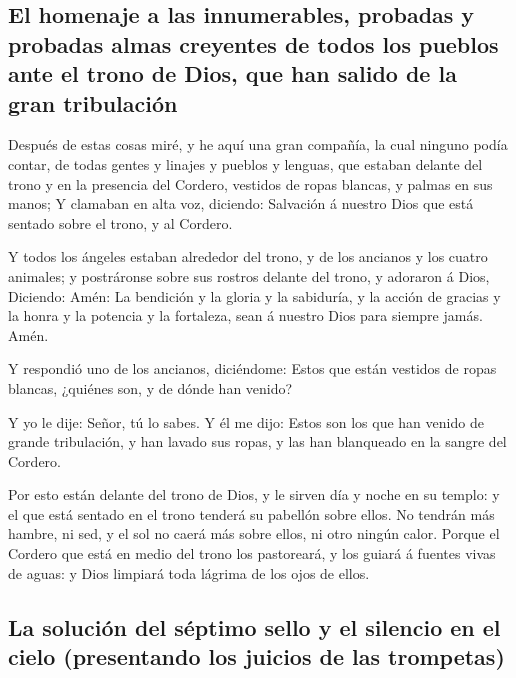 \hypertarget{el-homenaje-a-las-innumerables-probadas-y-probadas-almas-creyentes-de-todos-los-pueblos-ante-el-trono-de-dios-que-han-salido-de-la-gran-tribulaciuxf3n}{%
\subsection{El homenaje a las innumerables, probadas y probadas almas
creyentes de todos los pueblos ante el trono de Dios, que han salido de
la gran
tribulación}\label{el-homenaje-a-las-innumerables-probadas-y-probadas-almas-creyentes-de-todos-los-pueblos-ante-el-trono-de-dios-que-han-salido-de-la-gran-tribulaciuxf3n}}

 Después de estas cosas miré, y he aquí una gran compañía,
la cual ninguno podía contar, de todas gentes y linajes y pueblos y
lenguas, que estaban delante del trono y en la presencia del Cordero,
vestidos de ropas blancas, y palmas en sus manos;  Y
clamaban en alta voz, diciendo: Salvación á nuestro Dios que está
sentado sobre el trono, y al Cordero.

 Y todos los ángeles estaban alrededor del trono, y de
los ancianos y los cuatro animales; y postráronse sobre sus rostros
delante del trono, y adoraron á Dios,  Diciendo: Amén: La
bendición y la gloria y la sabiduría, y la acción de gracias y la honra
y la potencia y la fortaleza, sean á nuestro Dios para siempre jamás.
Amén.

 Y respondió uno de los ancianos, diciéndome: Estos que
están vestidos de ropas blancas, ¿quiénes son, y de dónde han venido?

 Y yo le dije: Señor, tú lo sabes. Y él me dijo: Estos
son los que han venido de grande tribulación, y han lavado sus ropas, y
las han blanqueado en la sangre del Cordero.

 Por esto están delante del trono de Dios, y le sirven
día y noche en su templo: y el que está sentado en el trono tenderá su
pabellón sobre ellos.  No tendrán más hambre, ni sed, y
el sol no caerá más sobre ellos, ni otro ningún calor. 
Porque el Cordero que está en medio del trono los pastoreará, y los
guiará á fuentes vivas de aguas: y Dios limpiará toda lágrima de los
ojos de ellos.

\hypertarget{la-soluciuxf3n-del-suxe9ptimo-sello-y-el-silencio-en-el-cielo-presentando-los-juicios-de-las-trompetas}{%
\subsection{La solución del séptimo sello y el silencio en el cielo
(presentando los juicios de las
trompetas)}\label{la-soluciuxf3n-del-suxe9ptimo-sello-y-el-silencio-en-el-cielo-presentando-los-juicios-de-las-trompetas}}

